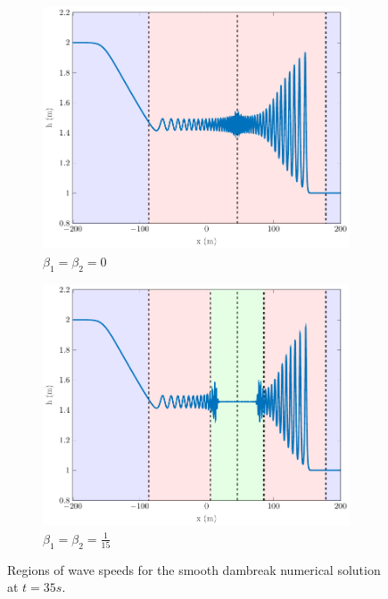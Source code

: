 \documentclass[10pt]{article}
\begin{document}
\begin{figure}
	\centering
	\begin{subfigure}{0.49\textwidth}
		\centering
		\includegraphics[width=\textwidth]{./Figures/Simulations/Study/ImpDisp/Regions/hRegionsSerre.pdf}
		\caption{$\beta_1 = \beta_2 = 0$}
	\end{subfigure}
	\begin{subfigure}{0.49\textwidth}
		\centering
		\includegraphics[width=\textwidth]{./Figures/Simulations/Study/ImpDisp/Regions/hRegionsImpDisp.pdf}
		\caption{$\beta_1 = \beta_2 = \frac{1}{15}$}
	\end{subfigure}
	\caption{Regions of wave speeds for the smooth dambreak numerical solution at $t=35s$.}
\end{figure}
\end{document}
